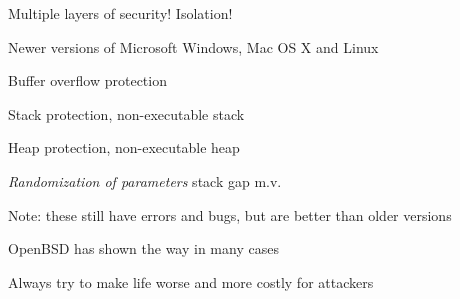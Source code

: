 \documentclass[Screen16to9,17pt]{foils}
\begin{document}


\centerline{\hlkbig\color{security6blue} Multiple layers of security! Isolation!}



\begin{list1}
\item Newer versions of Microsoft Windows, Mac OS X and Linux
\begin{list2}
\item Buffer overflow protection
\item Stack protection, non-executable stack
\item Heap protection, non-executable heap
\item \emph{Randomization of parameters} stack gap m.v.
\end{list2}
\item Note: these still have errors and bugs, but are better than older versions
\item OpenBSD has shown the way in many cases\\ 
\end{list1}

\vskip 1cm

\centerline{Always try to make life worse and more costly for attackers}


\slidenext{}
\end{document}
